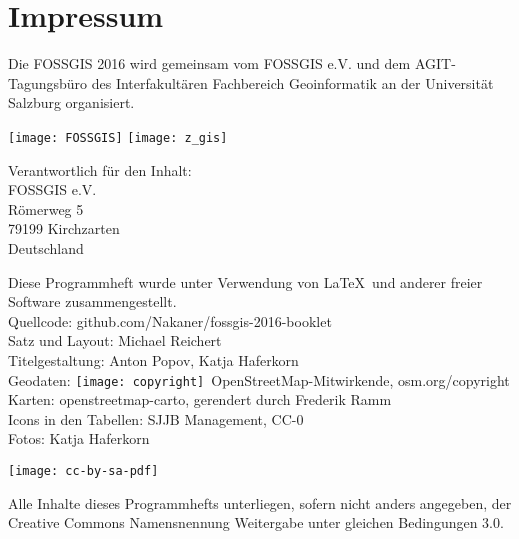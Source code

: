 \newpage
\section*{Impressum}
\label{impressum}

\cropmarkswallpaper

\RaggedRight
Die FOSSGIS 2016 wird gemeinsam vom FOSSGIS e.V. und dem AGIT-Tagungsbüro des Interfakultären Fachbereich Geoinformatik an der Universität Salzburg organisiert.

\vspace{0.5em}
	\texttt{[image: FOSSGIS]}
	\hfill
	\texttt{[image: z\_gis]}

\vspace{0.5em}
{\small\noindent Verantwortlich für den Inhalt:\\
FOSSGIS e.V.\\
Römerweg 5\\
79199 Kirchzarten\\
Deutschland

\vspace{0.5em}
\noindent Diese Programmheft wurde unter Verwendung von \LaTeX\ und 
anderer freier Software zusammengestellt.\\
 Quellcode: github.com/Nakaner/fossgis-2016-booklet\\
\noindent Satz und Layout: Michael Reichert\\
Titelgestaltung: Anton Popov, Katja Haferkorn\\
Geodaten: \texttt{[image: copyright]}~Open\-Street\-Map-Mitwirkende, osm.org/copyright\\
Karten: openstreetmap-carto, gerendert durch Frederik Ramm\\
Icons in den Tabellen: SJJB Management, CC-0\\
Fotos: Katja Haferkorn\\
}

\vspace{1em}
\noindent \begin{minipage}[htbp]{0.2\textwidth}
\noindent\texttt{[image: cc-by-sa-pdf]}
\end{minipage}
\hfill
\begin{minipage}[hbtp]{0.74\textwidth}\RaggedRight
Alle Inhalte dieses Programmhefts unterliegen, sofern nicht anders angegeben, 
der Creative Commons Namensnennung Weitergabe unter gleichen Bedingungen 3.0.
\end{minipage}


